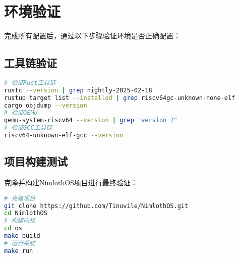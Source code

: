 \section{环境验证}

完成所有配置后，通过以下步骤验证环境是否正确配置：

\subsection{工具链验证}

\begin{lstlisting}[language=bash]
# 验证Rust工具链
rustc --version | grep nightly-2025-02-18
rustup target list --installed | grep riscv64gc-unknown-none-elf
cargo objdump --version
# 验证QEMU
qemu-system-riscv64 --version | grep "version 7"
# 验证GCC工具链
riscv64-unknown-elf-gcc --version
\end{lstlisting}

\subsection{项目构建测试}

克隆并构建NimlothOS项目进行最终验证：

\begin{lstlisting}[language=bash]
# 克隆项目
git clone https://github.com/Tinuvile/NimlothOS.git
cd NimlothOS
# 构建内核
cd os
make build
# 运行系统
make run
\end{lstlisting}
